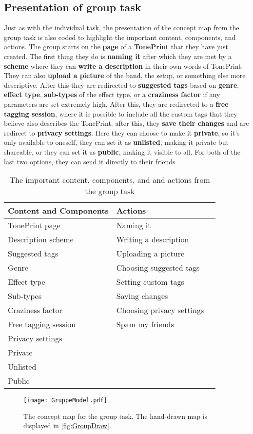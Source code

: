 \subsection*{Presentation of group task}
\label{GroupTaskPresentation}
Just as with the individual task, the presentation of the concept map from the group task is also coded to highlight the important content, components, and actions. The group starts on the \textbf{page} of a \textbf{TonePrint} that they have just created. The first thing they do is \textbf{naming it} after which they are met by a \textbf{scheme} where they can \textbf{write a description} in their own words of TonePrint. They can also \textbf{upload a picture} of the band, the setup, or something else more descriptive. After this they are redirected to \textbf{suggested tags} based on \textbf{genre}, \textbf{effect type}, \textbf{sub-types} of the effect type, or a \textbf{craziness factor} if any parameters are set extremely high. After this, they are redirected to a \textbf{free tagging session}, where it is possible to include all the custom tags that they believe also describes the TonePrint. after this, they \textbf{save their changes} and are redirect to \textbf{privacy settings}. Here they can choose to make it \textbf{private}, so it's only available to oneself, they can set it as \textbf{unlisted}, making it private but shareable, or they can set it as \textbf{public}, making it visible to all. For both of the last two options, they can send it directly to their friends
%
\begin{table}[H]
\begin{minipage}[b]{\linewidth}\centering
	\begin{tabular} {|l|l|l|} \hline
		\rowcolor{xGray25} \textbf{Content and Components} & \textbf{Actions} \\  \hline
		TonePrint page & Naming it \\
		Description scheme & Writing a description \\
		Suggested tags & Uploading a picture \\
		Genre & Choosing suggested tags \\
		Effect type & Setting custom tags \\
		Sub-types & Saving changes \\
		Craziness factor & Choosing privacy settings \\
		Free tagging session & Spam my friends \\
		Privacy settings & \\
		Private & \\
		Unlisted & \\
		Public & \\ \hline
	\end{tabular}
	\caption{The important content, components, and and actions from the group task}
	\label{tab:GroupContentActions}
\end{minipage}
\end{table}
%
\newpage
%
\begin{figure}[H]
	\centering
	\texttt{[image: GruppeModel.pdf]}
	\caption{The concept map for the group task. The hand-drawn map is displayed in \autoref{fig:GroupDraw}.}
	\label{fig:GroupConceptMap}
\end{figure}
%



